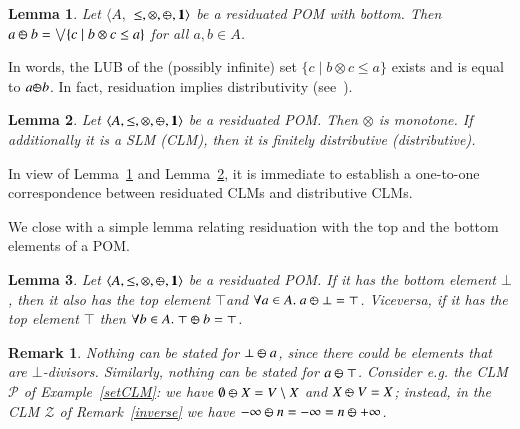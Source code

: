 \documentclass[a4paper]{elsarticle}
\newtheorem{remark}{Remark}
\newtheorem{lemma}{Lemma}
\newcommand{\monop}{\otimes}
\newcommand{\1}{\mathbf{1}}
\def\odiv{{ \ominus\hspace{-8pt}:}\;}
\begin{document}
\begin{lemma}\label{rclm1}
	Let $\langle A,$ $\leq, \otimes,  \odiv, \1 \rangle$ be a residuated POM with bottom.
	Then $a \mathbin{\odiv} b = \bigvee \{c \mid b \otimes c \leq a\}$ for all $a, b \in A$.
\end{lemma}

In words, the LUB of the (possibly infinite) set 
$\{c \mid b \otimes c \leq a\}$ exists and is equal to $a \odiv b$.
%
In fact, residuation implies distributivity (see~\cite[Lemma 2.2]{ipl}).

\begin{lemma}\label{rclm2}
	Let $\langle A, \leq, \monop, \odiv, \1 \rangle$ be a residuated POM. 
	Then $\monop$ is monotone.
	If additionally it is a SLM (CLM), then it is finitely distributive
	(distributive).
\end{lemma}

In view of Lemma~\ref{rclm1} and Lemma~\ref{rclm2}, it is immediate to
establish a one-to-one correspondence between residuated CLMs and distributive CLMs.

%

\smallskip
We close with a simple lemma relating residuation with the top and the bottom elements of a POM.

\begin{lemma}
	\label{someProps}
	Let $\langle A, \leq, \monop, \odiv, \1 \rangle$ be a residuated POM. 
	If it has the bottom element $\bot$, then it also has the top element $\top$and
	$\forall a \in A.\ a \mathbin{\odiv} \bot = \top$.
	Viceversa, if it has the top element $\top$ then
	$\forall b \in A.\ \top \mathbin{\odiv} b = \top$.
\end{lemma}

\begin{remark}
\label{usualNat}
	Nothing can be stated for $\bot \mathbin{\odiv} a$, since there could be elements that are 
	$\bot$-divisors. Similarly, nothing can be stated for $a \mathbin{\odiv} \top$.
	Consider e.g. the CLM $\mathcal{P}$ 
	of Example~\ref{setCLM}: we have $\emptyset \mathbin{\odiv} X = V\setminus X$
	and $X \mathbin{\odiv} V = X$; instead, in the CLM $\mathcal{Z}$ of Remark~\ref{inverse}
	we have ${-}\infty \mathbin{\odiv} n = {-}\infty = n \mathbin{\odiv} {+}\infty$.
\end{remark}
\end{document}
